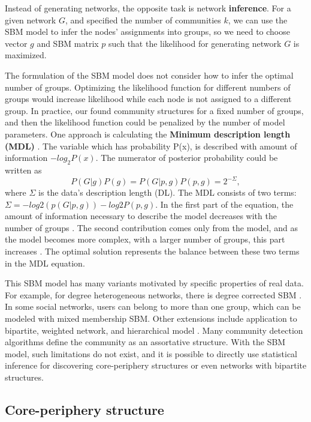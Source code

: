 Instead of generating networks, the opposite task is network \textbf{inference}. For a given network $G$, and specified the number of communities $k$, we can use the SBM model to infer the nodes' assignments into groups, so we need to choose vector $g$ and SBM matrix $p$ such that the likelihood for generating network $G$ is maximized. 

The formulation of the SBM model does not consider how to infer the optimal number of groups. Optimizing the likelihood function for different numbers of groups would increase likelihood while each node is not assigned to a different group. In practice, our found community structures for a fixed number of groups, and then the likelihood function could be penalized by the number of model parameters. One approach is calculating the \textbf{Minimum description length (MDL)} \cite{peixoto2019bayesian}. The variable which has probability P(x), is described with amount of information $-log_2P(x)$. The numerator of posterior probability could be written as
\begin{equation}
P(G|g)P(g) = P(G|p, g)P(p, g)=2^{-\Sigma},
\end{equation}
where $\Sigma$ is the data's description length (DL). The MDL consists of two terms: $\Sigma = -log2(p(G|p,g))-log2P(p,g)$. In the first part of the equation, the amount of information necessary to describe the model decreases with the number of groups \cite{peixoto2019bayesian}. The second contribution comes only from the model, and as the model becomes more complex, with a larger number of groups, this part increases \cite{peixoto2019bayesian}. The optimal solution represents the balance between these two terms in the MDL equation.  

This SBM model has many variants motivated by specific properties of real data. For example, for degree heterogeneous networks, there is degree corrected SBM \cite{karrer2011stochastic}. In some social networks, users can belong to more than one group, which can be modeled with mixed membership SBM. Other extensions include application to bipartite, weighted network, and hierarchical model \cite{funke2019}. Many community detection algorithms define the community as an assortative structure. With the SBM model, such limitations do not exist, and it is possible to directly use statistical inference for discovering core-periphery structures or even networks with bipartite structures.  

\subsection{Core-periphery structure}

